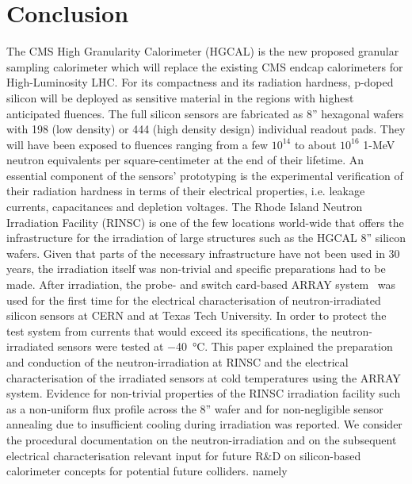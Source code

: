 \section{Conclusion}
\label{sec:conclusion}
The CMS High Granularity Calorimeter (HGCAL) is the new proposed granular sampling calorimeter which will replace the existing CMS endcap calorimeters for High-Luminosity LHC.
For its compactness and its radiation hardness, p-doped silicon will be deployed as sensitive material in the regions with highest anticipated fluences.
The full silicon sensors are fabricated as 8'' hexagonal wafers with 198 (low density) or 444 (high density design) individual readout pads.
They will have been exposed to fluences ranging from  a few $10^{14}$ to about $10^{16}$ 1-MeV neutron equivalents per square-centimeter at the end of their lifetime.\newline
An essential component of the sensors' prototyping is the experimental verification of their radiation hardness in terms of their electrical properties, i.e. leakage currents, capacitances and depletion voltages.
The Rhode Island Neutron Irradiation Facility (RINSC) is one of the few locations world-wide that offers the infrastructure for the irradiation of large structures such as the HGCAL 8'' silicon wafers.
Given that parts of the necessary infrastructure have not been used in 30$~$years, the irradiation itself was non-trivial and specific preparations had to be made.
After irradiation, the probe- and switch card-based ARRAY system~\cite{pitters:array2019} was used for the first time for the electrical characterisation of neutron-irradiated silicon sensors at CERN and at Texas Tech University.
In order to protect the test system from currents that would exceed its specifications, the neutron-irradiated sensors were tested at \SI{-40}{\celsius}.\newline
This paper explained the preparation and conduction of the neutron-irradiation at RINSC and the electrical characterisation of the irradiated sensors at cold temperatures using the ARRAY system.
Evidence for non-trivial properties of the RINSC irradiation facility such as a non-uniform flux profile across the 8'' wafer and for non-negligible sensor annealing due to insufficient cooling during irradiation was reported.
We consider the procedural documentation on the neutron-irradiation and on the subsequent electrical characterisation relevant input for future R$\&$D on silicon-based calorimeter concepts for potential future colliders.\newline
namely

